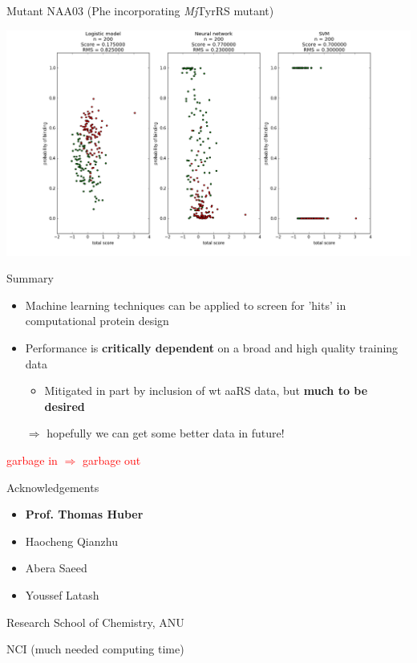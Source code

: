 \documentclass{beamer}
\begin{document}
\begin{frame}{Mutant NAA03 (Phe incorporating \textit{Mj}TyrRS mutant)}
    \begin{center}
    \includegraphics[scale = 0.23]{NAA03_classif.png}
    \end{center}
\end{frame}

\begin{frame}{Summary}
    \begin{itemize}
        \item Machine learning techniques can be applied to screen for 'hits' in computational protein design
        \item Performance is \textbf{critically dependent} on a broad and high quality training data
        \begin{itemize}
            \item Mitigated in part by inclusion of wt aaRS data, but \textbf{much to be desired}
        \end{itemize}
        $\Rightarrow$ hopefully we can get some better data in future!
    \end{itemize}
    
    \begin{center}\textcolor{red}{garbage in $\Rightarrow$ garbage out}\end{center}
\end{frame}

\begin{frame}{Acknowledgements}
\begin{itemize}
    \item \textbf{Prof. Thomas Huber}
    \item Haocheng Qianzhu
    \item Abera Saeed
    \item Youssef Latash
\end{itemize}

Research School of Chemistry, ANU

NCI (much needed computing time)

\end{frame}
\end{document}
